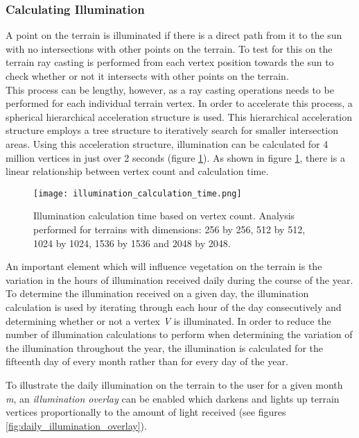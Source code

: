 \subsubsection{Calculating Illumination}

A point on the terrain is illuminated if there is a direct path from it to the sun with no intersections with other points on the terrain. To test for this on the terrain ray casting is performed from each vertex position towards the sun to check whether or not it intersects with other points on the terrain.\\
This process can be lengthy, however, as a ray casting operations needs to be performed for each individual terrain vertex. In order to accelerate this process, a spherical hierarchical acceleration structure is used. This hierarchical acceleration structure employs a tree structure to iteratively search for smaller intersection areas. Using this acceleration structure, illumination can be calculated for 4 million vertices in just over 2 seconds (figure \ref{fig:illumination_calculation_time}). As shown in figure \ref{fig:illumination_calculation_time}, there is a linear relationship between vertex count and calculation time. \\

\begin{figure}
\center
	\texttt{[image: illumination\_calculation\_time.png]}
	\caption{ Illumination calculation time based on vertex count. Analysis performed for terrains with dimensions: 256 by 256, 512 by 512, 1024 by 1024, 1536 by 1536 and 2048 by 2048. }
	\label{fig:illumination_calculation_time}
\end{figure}

An important element which will influence vegetation on the terrain is the variation in the hours of illumination received daily during the course of the year. To determine the illumination received on a given day, the illumination calculation is used by iterating through each hour of the day consecutively and determining whether or not a vertex \textit{V} is illuminated. In order to reduce the number of illumination calculations to perform when determining the variation of the illumination throughout the year, the illumination is calculated for the fifteenth day of every month rather than for every day of the year.

To illustrate the daily illumination on the terrain to the user for a given month \textit{m}, an \textit{illumination overlay} can be enabled which darkens and lights up terrain vertices proportionally to the amount of light received (see figures \ref{fig:daily_illumination_overlay}).


